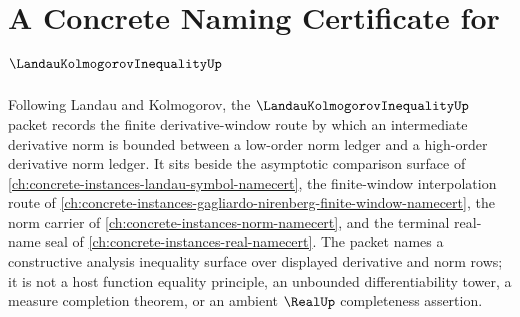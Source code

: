 \chapter{A Concrete Naming Certificate for $\LandauKolmogorovInequalityUp$}
\label{ch:concrete-instances-landau-kolmogorov-inequality-namecert}

Following Landau and Kolmogorov, the $\LandauKolmogorovInequalityUp$ packet records the finite derivative-window route by which an intermediate derivative norm is bounded between a low-order norm ledger and a high-order derivative norm ledger. It sits beside the asymptotic comparison surface of \autoref{ch:concrete-instances-landau-symbol-namecert}, the finite-window interpolation route of \autoref{ch:concrete-instances-gagliardo-nirenberg-finite-window-namecert}, the norm carrier of \autoref{ch:concrete-instances-norm-namecert}, and the terminal real-name seal of \autoref{ch:concrete-instances-real-namecert}. The packet names a constructive analysis inequality surface over displayed derivative and norm rows; it is not a host function equality principle, an unbounded differentiability tower, a measure completion theorem, or an ambient $\RealUp$ completeness assertion.

